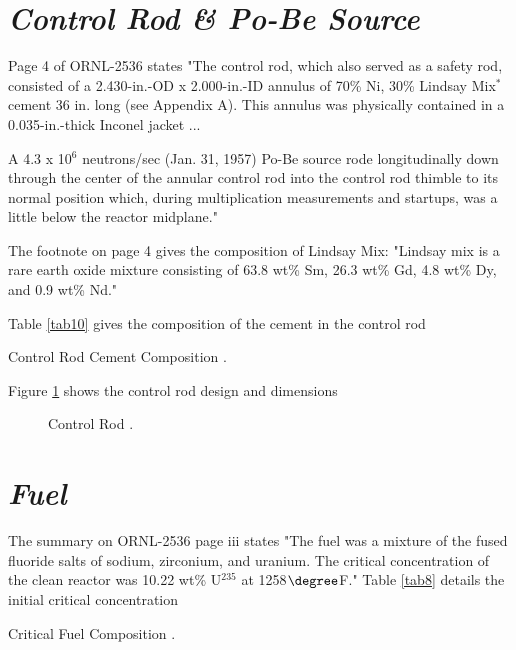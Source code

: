 \documentclass[ms,a4paper]{memoir}
\begin{document}
\section{\emph{Control Rod \& Po-Be Source}}

Page 4 of ORNL-2536 states "The control rod, which also served as a safety rod, consisted of a 2.430-in.-OD x 2.000-in.-ID annulus of 70\% Ni, 30\% Lindsay Mix$^*$ cement 36 in. long (see Appendix A). This annulus was physically contained in a 0.035-in.-thick Inconel jacket ...

A 4.3 x 10$^6$ neutrons/sec (Jan. 31, 1957) Po-Be source rode longitudinally down through the center of the annular control rod into the control rod thimble to its normal position which, during multiplication measurements and startups, was a little below the reactor midplane."

The footnote on page 4 gives the composition of Lindsay Mix: "Lindsay mix is a rare earth oxide mixture consisting of 63.8  wt\% Sm, 26.3 wt\% Gd, 4.8 wt\% Dy, and 0.9 wt\% Nd."

Table \ref{tab10} gives the composition of the cement in the control rod

\begin{table}[H]
  \centering
  \caption{Control Rod Cement Composition \parencite[Table 22]{ornl-2536}.}
  \label{tab10}
\end{table}


Figure \ref{fig8} shows the control rod design and dimensions

\begin{figure}[H]
  \centering
  \caption{Control Rod \parencite[Figure 28]{ornl-2536}.}
  \label{fig8}
\end{figure}

\section{\emph{Fuel}}

The summary on ORNL-2536 page iii states "The fuel was a mixture of the fused fluoride salts of sodium, zirconium, and uranium. The critical concentration of the clean reactor was 10.22 wt\% U$^{235}$ at 1258$\degree$F." Table \ref{tab8} details the initial critical concentration

\begin{table}[H]
  \centering
  \caption{Critical Fuel Composition \parencite[Table 1]{ornl-2536}.}
  \label{tab8}
\end{table}
\end{document}
